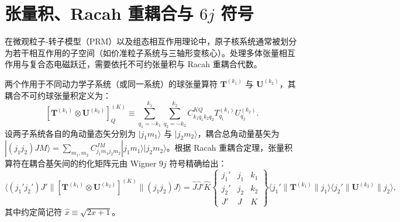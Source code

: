 \section{张量积、Racah 重耦合与 $6j$ 符号}\label{sec:appA-3}

在微观粒子-转子模型（PRM）以及组态相互作用理论中，原子核系统通常被划分为若干相互作用的子空间（如价准粒子系统与三轴形变核心）。处理多体张量相互作用与复合态电磁跃迁，需要依托不可约张量积与 Racah 重耦合代数。

两个作用于不同动力学子系统（或同一系统）的球张量算符 $\mathbf{T}^{(k_1)}$ 与 $\mathbf{U}^{(k_2)}$，其耦合不可约球张量积定义为：
\begin{equation}\label{eq:appA-tensor-product-def}
[\mathbf{T}^{(k_1)} \otimes \mathbf{U}^{(k_2)}]_Q^{(K)} \equiv \sum_{q_1=-k_1}^{k_1} \sum_{q_2=-k_2}^{k_2} C_{k_1 q_1 k_2 q_2}^{K Q} T_{q_1}^{(k_1)} U_{q_2}^{(k_2)} .
\end{equation}
设两子系统各自的角动量态矢分别为 $|j_1 m_1\rangle$ 与 $|j_2 m_2\rangle$，耦合总角动量基矢为 $|(j_1 j_2) J M\rangle = \sum_{m_1, m_2} C_{j_1 m_1 j_2 m_2}^{J M} |j_1 m_1\rangle |j_2 m_2\rangle$。根据 Racah 重耦合定理，张量积算符在耦合基矢间的约化矩阵元由 Wigner $9j$ 符号精确给出：
\begin{equation}\label{eq:appA-9j-rme}
\langle (j_1' j_2') J' \| [\mathbf{T}^{(k_1)} \otimes \mathbf{U}^{(k_2)}]^{(K)} \| (j_1 j_2) J \rangle = \hat{J} \hat{J}' \hat{K} \begin{Bmatrix} j_1' & j_1 & k_1 \\ j_2' & j_2 & k_2 \\ J' & J & K \end{Bmatrix} \langle j_1' \| \mathbf{T}^{(k_1)} \| j_1 \rangle \langle j_2' \| \mathbf{U}^{(k_2)} \| j_2 \rangle ,
\end{equation}
其中约定简记符 $\hat{x} \equiv \sqrt{2x + 1}$。

